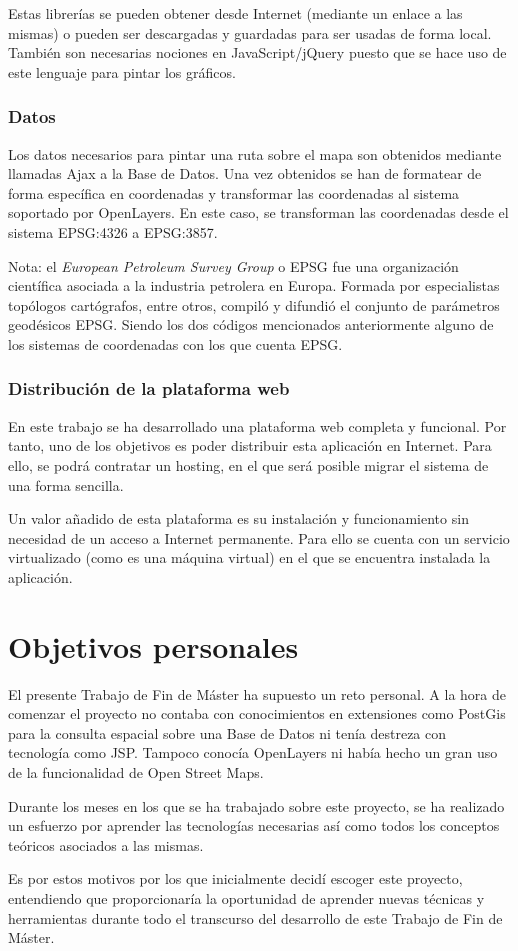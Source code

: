 Estas librerías se pueden obtener desde Internet (mediante un enlace a las mismas) o pueden ser descargadas y guardadas
para ser usadas de forma local. También son necesarias nociones en JavaScript/jQuery puesto que se hace uso de este lenguaje para pintar los gráficos.

\subsubsection{Datos}
Los datos necesarios para pintar una ruta sobre el mapa son obtenidos mediante llamadas Ajax a la Base de Datos. Una vez obtenidos se han de formatear de forma específica en coordenadas y transformar las coordenadas al sistema soportado por OpenLayers. En este caso, se transforman las coordenadas desde el sistema EPSG:4326 a EPSG:3857.

Nota: el \textit{European Petroleum Survey Group} o EPSG fue una organización científica asociada a la industria petrolera en Europa. Formada por especialistas topólogos cartógrafos, entre otros, compiló y difundió el conjunto de parámetros geodésicos EPSG. Siendo los dos códigos mencionados anteriormente alguno de los sistemas de coordenadas con los que cuenta EPSG.

\subsubsection{Distribución de la plataforma web}

En este trabajo se ha desarrollado una plataforma web completa y funcional. Por tanto, uno de los objetivos es poder distribuir esta aplicación en Internet. Para ello, se podrá contratar un hosting, en el que será posible migrar el sistema de una forma sencilla. 

Un valor añadido de esta plataforma es su instalación y funcionamiento sin necesidad de un
acceso a Internet permanente. Para ello se cuenta con un servicio virtualizado (como es una máquina
virtual) en el que se encuentra instalada la aplicación.


\section{Objetivos personales}

El presente Trabajo de Fin de Máster ha supuesto un reto personal. A la hora de comenzar el proyecto no contaba con conocimientos en extensiones como PostGis para la consulta espacial sobre una Base de Datos ni tenía destreza con tecnología como JSP. Tampoco conocía OpenLayers ni había hecho un gran uso de la funcionalidad de Open Street Maps. 

Durante los meses en los que se ha trabajado sobre este proyecto, se ha realizado un esfuerzo por aprender las tecnologías necesarias así como todos los conceptos teóricos asociados a las mismas.

Es por estos motivos por los que inicialmente decidí escoger este proyecto, entendiendo que proporcionaría la oportunidad de aprender nuevas técnicas y herramientas durante todo el transcurso del desarrollo de este Trabajo de Fin de Máster. 

